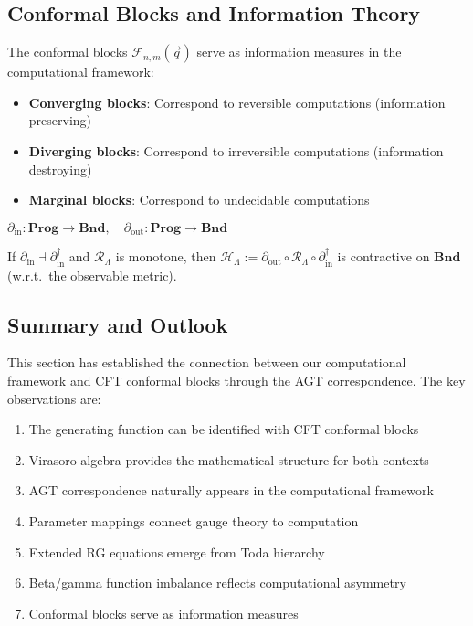 \subsection{Conformal Blocks and Information Theory}

\begin{theorem}
\label{thm:blocks-information}
The conformal blocks $\mathcal{F}_{n,m}(\vec{q})$ serve as information measures in the computational framework:
\begin{itemize}
\item \textbf{Converging blocks}: Correspond to reversible computations (information preserving)
\item \textbf{Diverging blocks}: Correspond to irreversible computations (information destroying)
\item \textbf{Marginal blocks}: Correspond to undecidable computations
\end{itemize}
\end{theorem}

\begin{definition}
\label{def:boundary-functors}
$\partial_{\mathrm{in}}:\mathbf{Prog}\to\mathbf{Bnd},\quad
\partial_{\mathrm{out}}:\mathbf{Prog}\to\mathbf{Bnd}$
\end{definition}

\begin{proposition}[Adjunction]
\label{prop:boundary-adjunction}
If $\partial_{\mathrm{in}}\dashv \partial_{\mathrm{in}}^\dagger$ and $\mathcal{R}_\Lambda$ is monotone,
then $\mathcal{H}_\Lambda:=\partial_{\mathrm{out}}\circ \mathcal{R}_\Lambda\circ \partial_{\mathrm{in}}^\dagger$
is contractive on $\mathbf{Bnd}$ (w.r.t.\ the observable metric).
\end{proposition}

\subsection{Summary and Outlook}

This section has established the connection between our computational framework and CFT conformal blocks through the AGT correspondence. The key observations are:

\begin{enumerate}
\item The generating function can be identified with CFT conformal blocks
\item Virasoro algebra provides the mathematical structure for both contexts
\item AGT correspondence naturally appears in the computational framework
\item Parameter mappings connect gauge theory to computation
\item Extended RG equations emerge from Toda hierarchy
\item Beta/gamma function imbalance reflects computational asymmetry
\item Conformal blocks serve as information measures
\end{enumerate}

